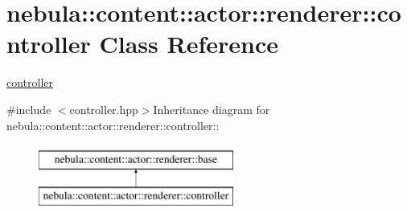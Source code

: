 \hypertarget{classnebula_1_1content_1_1actor_1_1renderer_1_1controller}{
\section{nebula::content::actor::renderer::controller Class Reference}
\label{classnebula_1_1content_1_1actor_1_1renderer_1_1controller}
}


\hyperlink{classnebula_1_1content_1_1actor_1_1renderer_1_1controller}{controller}  


{\ttfamily \#include $<$controller.hpp$>$}Inheritance diagram for nebula::content::actor::renderer::controller::\begin{figure}[H]
\begin{center}
\leavevmode
\includegraphics[height=2cm]{classnebula_1_1content_1_1actor_1_1renderer_1_1controller}
\end{center}
\end{figure}
